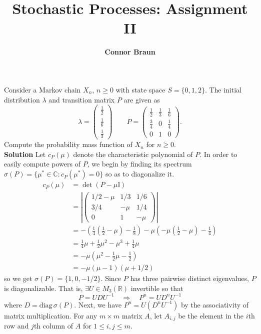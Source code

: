 \documentclass[11pt, letterpaper]{article}
\title{\bf Stochastic Processes: Assignment II}
\author{\bf Connor Braun}
\date{}
\newcommand{\mbb}[1]{\mathbb{#1}}
\begin{document}
    \maketitle

     Consider a Markov chain $X_n$, $n\geq 0$ with state space $S=\{0,1,2\}$. The initial distribution $\lambda$ and transition matrix $P$ are given as 
    \[\lambda=\begin{pmatrix}
        \frac{1}{2}\\[1.2pt]
        \frac{1}{6}\\[1.2pt]
        \frac{1}{3}
    \end{pmatrix}\qquad P=\begin{pmatrix}
        \frac{1}{2} & \frac{1}{3} & \frac{1}{6}\\[1.2pt]
        \frac{3}{4} & 0 & \frac{1}{4}\\[1.2pt]
        0 & 1 & 0
    \end{pmatrix}.\]
    Compute the probability mass function of $X_n$ for $n\geq 0$.\\[10pt]
    {\bf Solution} Let $c_P(\mu)$ denote the characteristic polynomial of $P$. In order to easily compute powers of $P$, we begin by finding its spectrum $\sigma (P)=\{\mu^\ast\in\mbb{C}:c_P(\mu^\ast)=0\}$ so as to diagonalize it.
    \begin{align*}
        c_P(\mu)&=\det(P-\mu\mbb{I})\\
        &=\left|\begin{pmatrix}
            1/2-\mu & 1/3 & 1/6\\
            3/4 & -\mu & 1/4\\
            0 & 1 & -\mu
        \end{pmatrix}\right|\\
        &=-\left(\frac{1}{4}\left(\frac{1}{2}-\mu\right)-\frac{1}{8}\right)-\mu\left(-\mu\left(\frac{1}{2}-\mu\right)-\frac{1}{4}\right)\\
        &=\frac{1}{4}\mu+\frac{1}{2}\mu^2-\mu^3+\frac{1}{4}\mu\\
        &=-\mu\left(\mu^2-\frac{1}{2}\mu-\frac{1}{2}\right)\\
        &=-\mu(\mu-1)(\mu+1/2)
    \end{align*}
    so we get $\sigma(P)=\{1,0,-1/2\}$. Since $P$ has three pairwise distinct eigenvalues, $P$ is diagonalizable. That is, $\exists U\in M_3(\mbb{R})$ invertible so that
    \[P=UDU^{-1}\quad\Rightarrow\quad P^n=UD^nU^{-1}\]
    where $D=\text{diag}\,\sigma(P)$. Next, we have $P^n=U(D^nU^{-1})$ by the associativity of matrix multiplication. For any $m\times m$ matrix $A$, let $A_{i,j}$ be the element in the $i$th row and $j$th column of $A$ for $1\leq i,j\leq m$.
\end{document}
